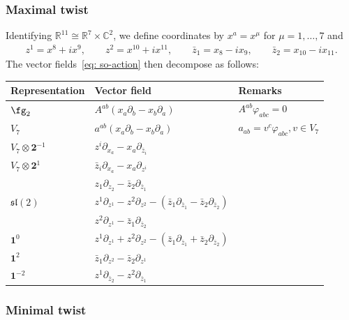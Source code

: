 \documentclass[10pt,a4paper]{amsart}
\numberwithin{equation}{section}
\theoremstyle{definition}
\def\R{\mathbb{R}}
\def\C{\mathbb{C}}
\def\lie#1{\ensuremath{\mathfrak{#1}}}
\begin{document}
\subsubsection{Maximal twist}
Identifying $\R^{11} \cong \R^7 \times \C^2$, we define coordinates by $x^a = x^\mu$ for $\mu = 1,\dots, 7$ and
\begin{gather*}
 z^1 = x^{8} + i x^{9} , \qquad z^2 = x^{10} + i x^{11},\qquad
 \bar{z}_1 = x_{8} - i x_{9} , \qquad \bar{z}_2 = x_{10} - i x_{11}.
\end{gather*}
The vector fields~\eqref{eq: so-action} then decompose as follows:
\begin{table}[!ht]\renewcommand{\arraystretch}{1.2}
\centering
\begin{tabular}{|l|l|l|}
\hline
Representation & Vector field & Remarks \\ \hline
\(\fg_2\) & \(A^{ab} (x_a \partial_b - x_b \partial_a)\) & \(A^{ab} \varphi_{abc} = 0\) \\
\hline
\(V_7\) & \(a^{ab} (x_a \partial_b - x_b \partial_a)\) & \(a_{ab} = v^c \varphi_{abc}, v \in V_7\) \\
 \hline
\(V_7 \otimes \textbf{2}^{-1}\) & \(z^i \partial_{x_a} - x_a \partial_{\bar{z}_i}\) & \\
\hline
\(V_7 \otimes \textbf{2}^{1}\) & \(\bar{z}_i \partial_{x_a} - x_a \partial_{z^i} \) & \\
\hline
 & \(z_1 \partial_{z_2} - \bar{z}_2 \partial_{\bar{z}_1}\) & \\
\(\lie{sl}(2)\) & \(z^1 \partial_{z^1} - z^2 \partial_{z^2} - (\bar{z}_1 \partial_{\bar{z}_1} - \bar{z}_2 \partial_{\bar{z}_2})\) & \\
 & \(z^2 \partial_{z^1} - \bar{z}_1 \partial_{\bar{z}_2}\) & \\
\hline
\(\textbf{1}^{0}\) & \(z^1 \partial_{z^1} + z^2 \partial_{z^2} - (\bar{z}_1 \partial_{\bar{z}_1} + \bar{z}_2 \partial_{\bar{z}_2})\) & \\
 \hline
\(\textbf{1}^{2}\) & \(\bar{z}_1 \partial_{z^2} - \bar{z}_2 \partial_{z^1}\) & \\
 \hline
\(\textbf{1}^{-2}\) & \(z^1 \partial_{\bar{z}_2} - z^2 \partial_{\bar{z}_1}\)& \\
\hline
\end{tabular}
\end{table}

\pagebreak

\subsubsection{Minimal twist}
\end{document}
